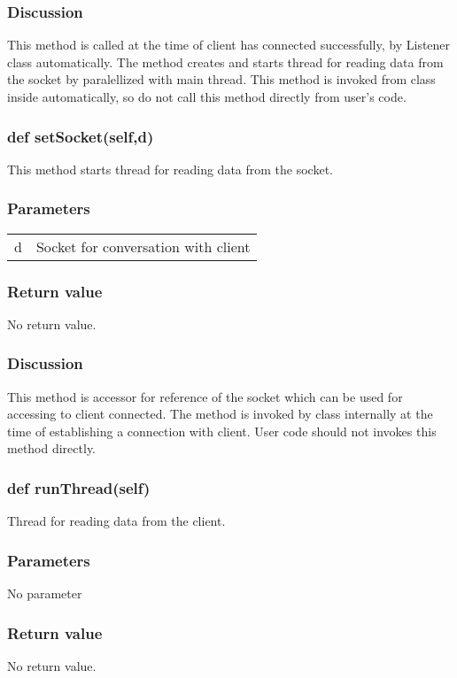\documentclass[a4paper,10pt]{jsarticle}
\begin{document}
\subsubsection*{Discussion}
This method is called at the time of client has connected successfully, by Listener class automatically.
The method creates and starts thread for reading data from the socket by paralellized with main thread.
This method is invoked from class inside automatically, so do not call this method directly from user's code.


\subsubsection{def setSocket(self,d)}
This method starts thread for reading data from the socket.

\subsubsection*{Parameters}
\begin{tabular}{ll}
d	&Socket for conversation with client
\end{tabular}

\subsubsection*{Return value}
No return value.

\subsubsection*{Discussion}
This method is accessor for reference of the socket which can be used for accessing to client connected.
The method is invoked by class internally at the time of establishing a connection with client.
User code should not invokes this method directly.


\subsubsection{def runThread(self)}
Thread for reading data from the client.

\subsubsection*{Parameters}
No parameter

\subsubsection*{Return value}
No return value.
\end{document}
